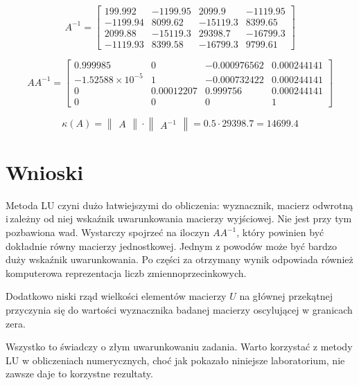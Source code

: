 \begin{equation*}
A^{-1} = 
\begin{bmatrix}
199.992 &-1199.95 &2099.9 &-1119.95 \\
-1199.94 &8099.62 &-15119.3& 8399.65 \\
2099.88 &-15119.3 &29398.7 &-16799.3 \\ 
-1119.93 &8399.58& -16799.3 &9799.61 
\end{bmatrix}
\end{equation*}

\begin{equation*}
AA^{-1} = 
\begin{bmatrix}
0.999985 &0 &-0.000976562 &0.000244141 \\
-1.52588\times10^{-5} &1 &-0.000732422& 0.000244141\\ 
0& 0.00012207 &0.999756 &0.000244141 \\
0 &0& 0& 1 
\end{bmatrix}
\end{equation*}

$$ \kappa(A)= \begin{Vmatrix} A \end{Vmatrix} \cdot \begin{Vmatrix} A^{-1} \end{Vmatrix} = 0.5\cdot29398.7 = 14699.4 $$

\section{Wnioski}

Metoda LU czyni dużo łatwiejszymi do obliczenia: wyznacznik, macierz odwrotną i\,zależny od niej wskaźnik uwarunkowania macierzy wyjściowej. Nie jest przy tym pozbawiona wad. Wystarczy spojrzeć na iloczyn $ AA^{-1} $, który powinien być dokładnie równy macierzy jednostkowej. Jednym z powodów może być bardzo duży wskaźnik uwarunkowania. Po części za otrzymany wynik odpowiada również komputerowa reprezentacja liczb zmiennoprzecinkowych.

Dodatkowo niski rząd wielkości elementów macierzy $ U $ na głównej przekątnej przyczynia się do wartości wyznacznika badanej macierzy oscylującej w granicach zera. 

Wszystko to świadczy o złym uwarunkowaniu zadania. Warto korzystać z metody LU w obliczeniach numerycznych, choć jak pokazało niniejsze laboratorium, nie zawsze daje to korzystne rezultaty.

